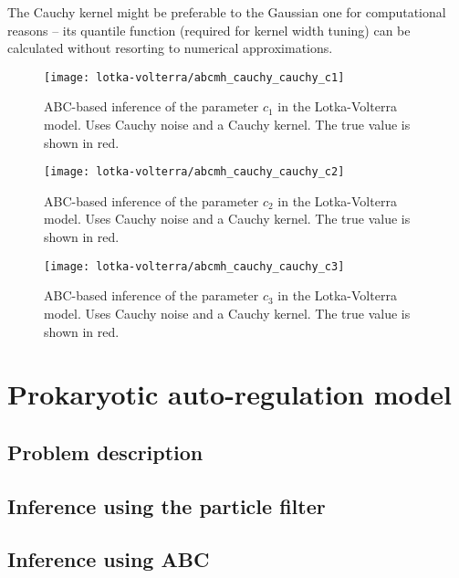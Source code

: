 The Cauchy kernel might be preferable to the Gaussian one for computational reasons -- its quantile function (required for kernel width tuning) can be calculated without resorting to numerical approximations.

\begin{figure}[ht]
    \centering
    \texttt{[image: lotka-volterra/abcmh\_cauchy\_cauchy\_c1]}
    \caption{ABC-based inference of the parameter $c_1$ in the Lotka-Volterra model. Uses Cauchy noise and a Cauchy kernel. The true value is shown in red.}
    \label{fig:lv-abcmh-cauchy-cauchy-c1}
\end{figure}

\begin{figure}[ht]
    \centering
    \texttt{[image: lotka-volterra/abcmh\_cauchy\_cauchy\_c2]}
    \caption{ABC-based inference of the parameter $c_2$ in the Lotka-Volterra model. Uses Cauchy noise and a Cauchy kernel. The true value is shown in red.}
    \label{fig:lv-abcmh-cauchy-cauchy-c2}
\end{figure}

\begin{figure}[ht]
    \centering
    \texttt{[image: lotka-volterra/abcmh\_cauchy\_cauchy\_c3]}
    \caption{ABC-based inference of the parameter $c_3$ in the Lotka-Volterra model. Uses Cauchy noise and a Cauchy kernel. The true value is shown in red.}
    \label{fig:lv-abcmh-cauchy-cauchy-c3}
\end{figure}



\section{Prokaryotic auto-regulation model} \label{sec:autoregulation}
\subsection{Problem description}

\subsection{Inference using the particle filter}

\subsection{Inference using ABC}